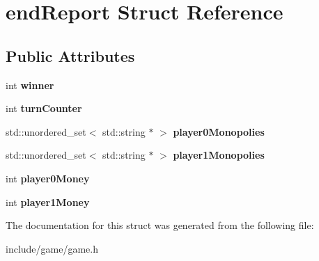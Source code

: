 \hypertarget{structendReport}{\section{end\-Report Struct Reference}
\label{structendReport}
}
\subsection*{Public Attributes}
\begin{DoxyCompactItemize}
\item 
\hypertarget{structendReport_a692265d1b9aec82326fa57a6eb69ce67}{int {\bfseries winner}}\label{structendReport_a692265d1b9aec82326fa57a6eb69ce67}

\item 
\hypertarget{structendReport_a3c48b0aa266c34cbfbc789e9ec6f7306}{int {\bfseries turn\-Counter}}\label{structendReport_a3c48b0aa266c34cbfbc789e9ec6f7306}

\item 
\hypertarget{structendReport_a732c0d81b86a07b8e2b76b33f15ce0fb}{std\-::unordered\-\_\-set$<$ std\-::string $\ast$ $>$ {\bfseries player0\-Monopolies}}\label{structendReport_a732c0d81b86a07b8e2b76b33f15ce0fb}

\item 
\hypertarget{structendReport_a983068bf9d2ae8590c7ccb5206f9f9f5}{std\-::unordered\-\_\-set$<$ std\-::string $\ast$ $>$ {\bfseries player1\-Monopolies}}\label{structendReport_a983068bf9d2ae8590c7ccb5206f9f9f5}

\item 
\hypertarget{structendReport_ac9716415dbefb50251b02242170b6858}{int {\bfseries player0\-Money}}\label{structendReport_ac9716415dbefb50251b02242170b6858}

\item 
\hypertarget{structendReport_a47afbfc884db12aa412f5a08cdae10ba}{int {\bfseries player1\-Money}}\label{structendReport_a47afbfc884db12aa412f5a08cdae10ba}

\end{DoxyCompactItemize}


The documentation for this struct was generated from the following file\-:\begin{DoxyCompactItemize}
\item 
include/game/game.\-h\end{DoxyCompactItemize}
